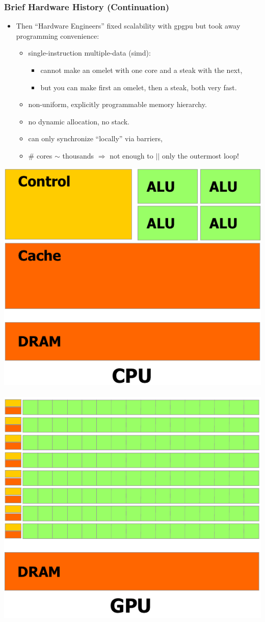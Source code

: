 \documentclass{beamer}
\renewcommand{\emph}[1]{\textcolor{structure}{#1}}
\newcommand{\emp}[1]{\textcolor{DikuRed}{ #1}}
\begin{document}
\begin{frame}
  \frametitle{Brief Hardware History (Continuation)} %
  \centering
 \begin{itemize}
    \item Then ``Hardware Engineers'' fixed \emph{scalability} with \emph{{\sc gpgpu}} but took away \emp{programming convenience}:  \smallskip
        \begin{itemize}
            \item single-instruction multiple-data ({\sc simd}): 
                \begin{itemize}
                    \item cannot make an omelet with one core and a steak with the next,
                    \item but you can make first an omelet, then a steak, both very fast. 
                \end{itemize}\smallskip
            \item non-uniform, explicitly programmable memory hierarchy.\smallskip
            \item no dynamic allocation, no stack.\smallskip
            \item can only synchronize ``locally'' via barriers,
            \item \# cores $\sim$ thousands $\Rightarrow$ not enough to $||$ only the outermost loop!
        \end{itemize}
\end{itemize}

\begin{center} 
\includegraphics[height=20ex]{ParTeaserFigs/MulticoreArch.png}  
$\mbox{ }\mbox{ }\mbox{ }\mbox{ }\mbox{ }\mbox{ }\mbox{ }\mbox{ }\mbox{ }\mbox{ }\mbox{ }\mbox{ }\mbox{ }\mbox{ }\mbox{ }\mbox{ }$ 
\includegraphics[height=20ex]{ParTeaserFigs/GPGPUarch.png}  
\end{center} 
\end{frame}
\end{document}

